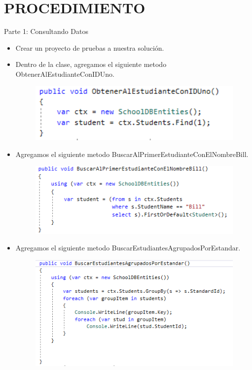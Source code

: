 \section{PROCEDIMIENTO} 
Parte 1: Consultando Datos
\begin{itemize}
	\item Crear un proyecto de pruebas a nuestra solución.
	\item Dentro de la clase, agregamos el siguiente metodo ObtenerAlEstudianteConIDUno.
	\begin{figure}[htb]
\begin{center}
\includegraphics[width=12cm]{./Imagenes/1-1}
\end{center}
\end{figure}
	\item Agregamos el siguiente metodo BuscarAlPrimerEstudianteConElNombreBill.
\begin{figure}[htb]
\begin{center}
\includegraphics[width=12cm]{./Imagenes/1-2}
\end{center}
\end{figure}
	\item Agregamos el siguiente metodo BuscarEstudiantesAgrupadosPorEstandar.
\begin{figure}[htb]
\begin{center}
\includegraphics[width=12cm]{./Imagenes/1-3}

\end{center}
\end{figure}
\end{itemize}
